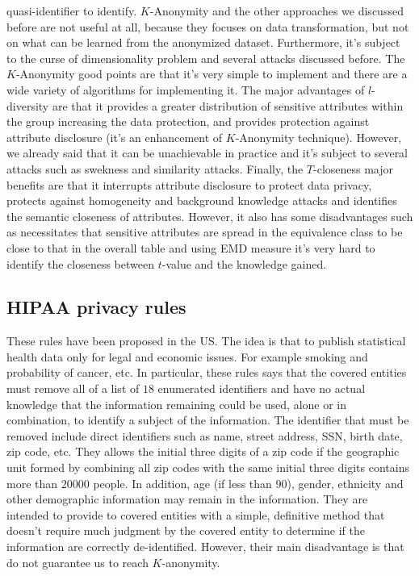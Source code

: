 quasi-identifier to identify. $K$-Anonymity and the other approaches we discussed before are not useful at all, because they focuses on data transformation, but not on what can be learned from the anonymized dataset. Furthermore, it's subject to the curse of dimensionality problem and several attacks discussed before. The $K$-Anonymity good points are that it's very simple to implement and there are a wide variety of algorithms for implementing it. The major advantages of $l$-diversity are that it provides a greater distribution of sensitive attributes within the group increasing the data protection, and provides protection against attribute disclosure (it's an enhancement of $K$-Anonymity technique). However, we already said that it can be unachievable in practice and it's subject to several attacks such as swekness and similarity attacks. Finally, the $T$-closeness major benefits are that it interrupts attribute disclosure to protect data privacy, protects against homogeneity and background knowledge attacks and identifies the semantic closeness of attributes. However, it also has some disadvantages such as necessitates that sensitive attributes are spread in the equivalence class to be close to that in the overall table and using EMD measure it's very hard to identify the closeness between $t$-value and the knowledge gained.

\subsection{HIPAA privacy rules}
These rules have been proposed in the US. The idea is that to publish statistical health data only for legal and economic issues. For example smoking and probability of cancer, etc. In particular, these rules says that the covered entities must remove all of a list of $18$ enumerated identifiers and have no actual knowledge that the information remaining could be used, alone or in combination, to identify a subject of the information. The identifier that must be removed include direct identifiers such as name, street address, SSN, birth date, zip code, etc. They allows the initial three digits of a zip code if the geographic unit formed by combining all zip codes with the same initial three digits contains more than $20000$ people. In addition, age (if less than $90$), gender, ethnicity and other demographic information may remain in the information. They are intended to provide to covered entities with a simple, definitive method that doesn't require much judgment by the covered entity to determine if the information are correctly de-identified. However, their main disadvantage is that do not guarantee us to reach $K$-anonymity.


